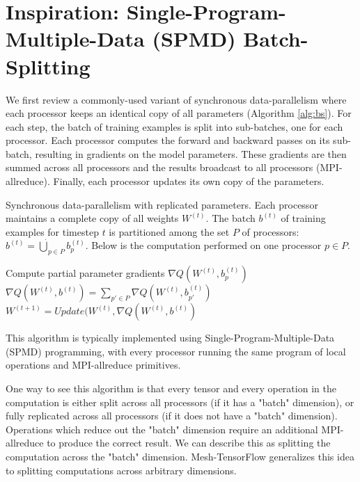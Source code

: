 \documentclass{article}
\begin{document}
\section{Inspiration: Single-Program-Multiple-Data (SPMD) Batch-Splitting} \label{sec:bs}
We first review a commonly-used variant of synchronous data-parallelism where each processor keeps an identical copy of all parameters (Algorithm \ref{alg:bs}).  For each step, the batch of training examples is split into sub-batches, one for each processor.  Each processor computes the forward and backward passes on its sub-batch, resulting in gradients on the model parameters.  These gradients are then summed across all processors and the results broadcast to all processors (MPI-allreduce).  Finally, each processor updates its own copy of the parameters.

\begin{algorithm}[h!]
\caption{Synchronous data-parallelism with replicated parameters.  Each processor maintains a complete copy of all weights $W^{(t)}$. The batch $b^{(t)}$ of training examples for timestep $t$ is partitioned among the set $P$ of processors:  $b^{(t)} = \dot\bigcup_{p\in P} b^{(t)}_p$.   Below is the computation performed on one processor $p \in P$. }
\begin{algorithmic}[1]
\State Compute partial parameter gradients $\nabla Q(W^{(t)}, b^{(t)}_p)$ 
\State $\nabla Q(W^{(t)}, b^{(t)}) = \sum_{p' \in P} \nabla Q(W^{(t)}, b^{(t)}_{p'})$ 
\State $W^{(t+1)} = Update(W^{(t)}, \nabla Q(W^{(t)}, b^{(t)})$ 
\end{algorithmic}
\label{alg:bs}
\end{algorithm}

This algorithm is typically implemented using Single-Program-Multiple-Data (SPMD) programming, with every processor running the same program of local operations and MPI-allreduce primitives.

One way to see this algorithm is that every tensor and every operation in the computation is either split across all processors (if it has a "batch" dimension), or fully replicated across all processors (if it does not have a "batch" dimension). Operations which reduce out the "batch" dimension require an additional MPI-allreduce to produce the correct result.  We can describe this as splitting the computation across the "batch" dimension.  Mesh-TensorFlow generalizes this idea to splitting computations across arbitrary dimensions.
\end{document}
